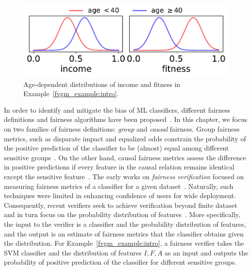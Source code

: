 \begin{figure}[h!]
	\begin{center}
		\includegraphics[scale = 0.5]{figures/fairness/fvgm/sanity_probability}
	\end{center}
	\caption[Illustrative distribution of features]{Age-dependent distributions of income and fitness in Example~\ref{fvgm_example:intro}.}\label{fvgm_fig:example1}
\end{figure}


	In order to identify and mitigate the bias of ML classifiers, different fairness definitions and fairness algorithms have been proposed~\cite{hardt2016equality,kusner2017counterfactual,mehrabi2019survey}.	In this chapter, we focus on two families of fairness definitions: \textit{group} and \textit{causal} fairness. Group fairness metrics, such as disparate impact and equalized odds constrain the probability of the positive prediction of the classifier to be (almost) equal among different sensitive groups~\cite{dwork2012fairness,feldman2015certifying}.	On the other hand, causal fairness metrics assess the difference in positive predictions  if every feature in the causal relation  remains identical except the sensitive feature~\cite{nabi2018fair,zhang2018fairness}. The early works on \textit{fairness verification} focused on measuring fairness metrics of a classifier for a given dataset~\cite{aif360-oct-2018}. Naturally, such techniques were limited in enhancing confidence of users for wide deployment. Consequently, recent verifiers seek to achieve verification beyond  finite dataset and in turn focus on the  probability distribution of features~\cite{albarghouthi2017fairsquare, bastani2019probabilistic, ghosh2020justicia}.  More specifically, the input to the verifier is a classifier and  the probability distribution of features, and the output is an estimate of fairness metrics that the classifier obtains given the distribution. For Example~\ref{fvgm_example:intro}, a fairness verifier takes the SVM classifier and the distribution of features $ I, F, A $ as an input and outputs the probability of positive prediction of the classifier for  different sensitive groups. 
	
